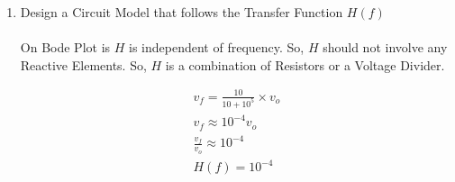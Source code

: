 \begin{enumerate}[label=\thesubsection.\arabic*.,ref=\thesubsection.\theenumi]
\item Design a Circuit Model that follows the Transfer Function $H(f)$\\
\solution\\
On Bode Plot is $H$ is independent of frequency. So, $H$  should not involve any Reactive Elements. So, $H$ is a combination of Resistors or a Voltage Divider.
\begin{figure}[ht!]
	\begin{center}
		\resizebox{\columnwidth/2}{!}{}
	\end{center}
	\caption{}
	\label{fig:Circuit}
\end{figure}

\begin{align}
v_{f} = \frac{10}{10 + 10^{5}} \times v_{o}\\
v_{f} \approx 10^{-4} v_{o}\\
\frac{v_{f}}{v_{o}} \approx 10^{-4}\\
H(f) = 10^{-4}
\end{align}

\end{enumerate}
